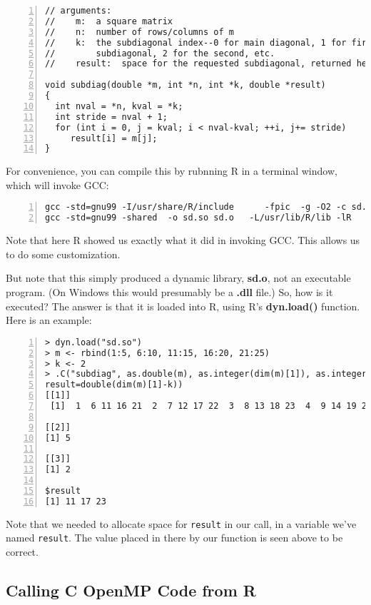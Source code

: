 \begin{lstlisting}[numbers=left]
// arguments:
//    m:  a square matrix
//    n:  number of rows/columns of m
//    k:  the subdiagonal index--0 for main diagonal, 1 for first
//        subdiagonal, 2 for the second, etc.
//    result:  space for the requested subdiagonal, returned here

void subdiag(double *m, int *n, int *k, double *result)
{
  int nval = *n, kval = *k;
  int stride = nval + 1;
  for (int i = 0, j = kval; i < nval-kval; ++i, j+= stride)
     result[i] = m[j];
}
\end{lstlisting}

For convenience, you can compile this by rubnning R in a terminal
window, which will invoke GCC:

\begin{lstlisting}[numbers=left]
% R CMD SHLIB sd.c
gcc -std=gnu99 -I/usr/share/R/include      -fpic  -g -O2 -c sd.c -o sd.o
gcc -std=gnu99 -shared  -o sd.so sd.o   -L/usr/lib/R/lib -lR
\end{lstlisting}

Note that here R showed us exactly what it did in invoking GCC.  This
allows us to do some customization.

But note that this simply produced a dynamic library, {\bf sd.o}, not an
executable program.  (On Windows this would presumably be a {\bf .dll}
file.)  So, how is it executed?  The answer is that it is loaded into R,
using R's {\bf dyn.load()} function.  Here is an example:

\begin{lstlisting}[numbers=left]
> dyn.load("sd.so")
> m <- rbind(1:5, 6:10, 11:15, 16:20, 21:25)
> k <- 2
> .C("subdiag", as.double(m), as.integer(dim(m)[1]), as.integer(k),
result=double(dim(m)[1]-k))
[[1]]
 [1]  1  6 11 16 21  2  7 12 17 22  3  8 13 18 23  4  9 14 19 24  5 10 15 20 25

[[2]]
[1] 5

[[3]]
[1] 2

$result
[1] 11 17 23
\end{lstlisting}

Note that we needed to allocate space for {\tt result} in our call, in a
variable we've named {\tt result}.  The value placed in there by our
function is seen above to be correct.

\subsection{Calling C OpenMP Code from R}

